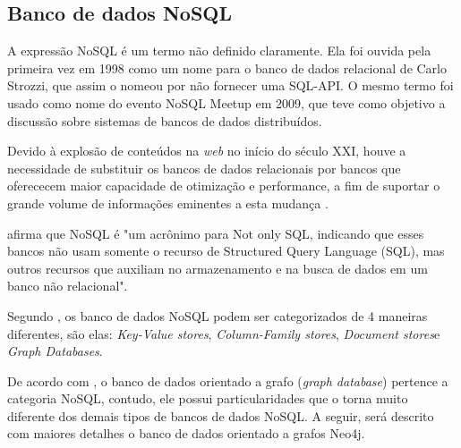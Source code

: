 \subsection{Banco de dados NoSQL}

\par A expressão NoSQL é um termo não definido claramente. Ela foi ouvida pela primeira vez em 1998 como um nome para o banco de dados relacional de Carlo Strozzi, que assim o nomeou por não fornecer uma SQL-API. O mesmo termo foi usado como nome do evento NoSQL Meetup em 2009, que teve como objetivo a discussão sobre sistemas de bancos de dados distribuídos.

\par Devido à explosão de conteúdos na \textit{web} no início do século XXI, houve a necessidade de substituir os bancos de dados relacionais por bancos que oferececem maior capacidade de otimização e performance, a fim de suportar o grande volume de informações eminentes a esta mudança \cite{bruggen_learning_neo4j}.

\par {} afirma que NoSQL é "um acrônimo para Not only SQL, indicando que esses bancos não usam somente o recurso de Structured Query Language (SQL), mas outros recursos que auxiliam no armazenamento e na busca de dados em um banco  não relacional".

\par Segundo , os banco de dados NoSQL podem ser categorizados de 4 maneiras diferentes, são elas: \textit{Key-Value stores}\footnotemark[7], \textit{Column-Family stores}\footnotemark[8], \textit{Document stores}\footnotemark[9] e \textit{Graph Databases}\footnotemark[10].





\par De acordo com , o banco de dados orientado a grafo (\textit{graph database}) pertence a categoria NoSQL, contudo, ele possui particularidades que o torna muito diferente dos demais tipos de bancos de dados NoSQL. A seguir, será descrito com maiores detalhes o banco de dados orientado a grafos Neo4j.
